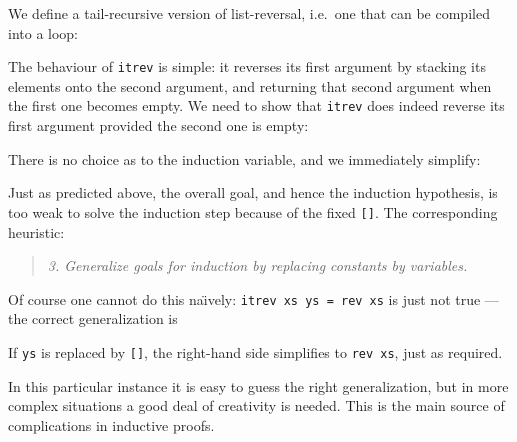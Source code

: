 We define a tail-recursive version of list-reversal,
i.e.\ one that can be compiled into a loop:
\begin{ttbox}
\end{ttbox}
The behaviour of \texttt{itrev} is simple: it reverses its first argument by
stacking its elements onto the second argument, and returning that second
argument when the first one becomes empty.
We need to show that \texttt{itrev} does indeed reverse its first argument
provided the second one is empty:
\begin{ttbox}
\end{ttbox}
There is no choice as to the induction variable, and we immediately simplify:
\begin{ttbox}\makeatother
\ttbreak
{}
\end{ttbox}
Just as predicted above, the overall goal, and hence the induction
hypothesis, is too weak to solve the induction step because of the fixed
\texttt{[]}. The corresponding heuristic:
\begin{quote}
{\em 3. Generalize goals for induction by replacing constants by variables.}
\end{quote}
Of course one cannot do this na\"{\i}vely: \texttt{itrev xs ys = rev xs} is
just not true --- the correct generalization is
\begin{ttbox}\makeatother
\end{ttbox}
If \texttt{ys} is replaced by \texttt{[]}, the right-hand side simplifies to
\texttt{rev xs}, just as required.

In this particular instance it is easy to guess the right generalization,
but in more complex situations a good deal of creativity is needed. This is
the main source of complications in inductive proofs.

